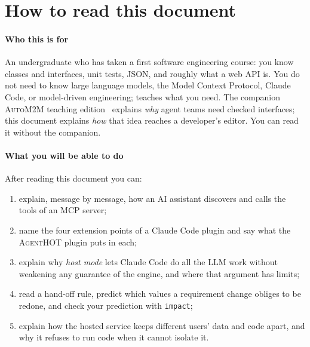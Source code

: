 \documentclass[10pt,a4paper]{article}
\newcommand{\tool}{\textsc{AgentHOT}}
\newcommand{\auto}{\textsc{AutoM2M}}
\newcommand{\cc}{Claude Code}
\newcommand{\mcptool}[1]{\texttt{#1}}
\begin{document}
{\hypersetup{linkcolor=black}
\setcounter{tocdepth}{1}
\makeatletter
\renewcommand*\l@section[2]{\addpenalty{-\@highpenalty}\vskip 0.15em
  {\sffamily\small\@dottedtocline{1}{0em}{2em}{#1}{#2}}}
\renewcommand*\l@subsection[2]{\small\@dottedtocline{2}{2em}{2.6em}{#1}{#2}}
\makeatother
\renewcommand{\contentsname}{\sffamily\color{accent}Contents}
\tableofcontents}

\section{How to read this document}\label{sec:read}

\paragraph{Who this is for} An undergraduate who has taken a first software
engineering course: you know classes and interfaces, unit tests, JSON, and
roughly what a web API is. You do not need to know large language models,
the Model Context Protocol, \cc{}, or model-driven engineering;
 teaches what you need. The companion \auto{} teaching
edition~\cite{autom2mteaching} explains \emph{why} agent teams need checked
interfaces; this document explains \emph{how} that idea reaches a
developer's editor. You can read it without the companion.

\paragraph{What you will be able to do} After reading this document you can:
\begin{enumerate}[itemsep=1pt]
\item explain, message by message, how an AI assistant discovers and calls
the tools of an MCP server;
\item name the four extension points of a \cc{} plugin and say what the
\tool{} plugin puts in each;
\item explain why \emph{host mode} lets \cc{} do all the LLM work without
weakening any guarantee of the engine, and where that argument has limits;
\item read a hand-off rule, predict which values a requirement change
obliges to be redone, and check your prediction with \mcptool{impact};
\item explain how the hosted service keeps different users' data and code
apart, and why it refuses to run code when it cannot isolate it.
\end{enumerate}
\end{document}
